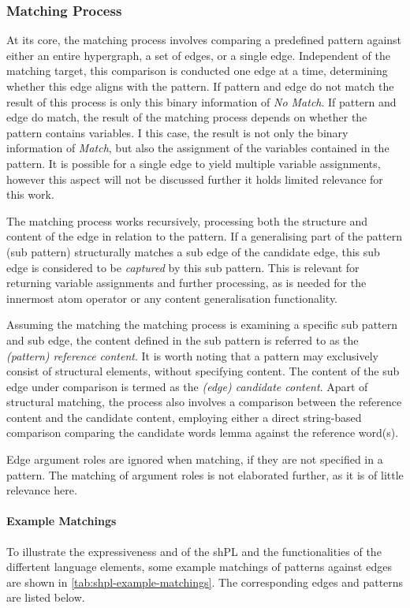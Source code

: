 \documentclass[11pt]{scrreprt}
\begin{document}
\subsubsection{Matching Process}
\label{sec:pattern-matching-process}
At its core, the matching process involves comparing a predefined pattern against either an entire hypergraph, a set of edges, or a single edge. Independent of the matching target, this comparison is conducted one edge at a time, determining whether this edge aligns with the pattern. If pattern and edge do not match the result of this process is only this binary information of \textit{No Match}. If pattern and edge do match, the result of the matching process depends on whether the pattern contains variables. I this case, the result is not only the binary information of \textit{Match}, but also the assignment of the variables contained in the pattern. It is possible for a single edge to yield multiple variable assignments, however this aspect will not be discussed further it holds limited relevance for this work. 

The matching process works recursively, processing both the structure and content of the edge in relation to the pattern. If a generalising part of the pattern (sub pattern) structurally matches a sub edge of the candidate edge, this sub edge is considered to be \textit{captured} by this sub pattern. This is relevant for returning variable assignments and further processing, as is needed for the innermost atom operator or any content generalisation functionality.

Assuming the matching the matching process is examining a specific sub pattern and sub edge, the content defined in the sub pattern is referred to as the \textit{(pattern) reference content}. It is worth noting that a pattern may exclusively consist of structural elements, without specifying content. The content of the sub edge under comparison is termed as the \textit{(edge) candidate content}. Apart of structural matching, the process also involves a comparison between the reference content and the candidate content, employing either a direct string-based comparison comparing the candidate words lemma against the reference word(s).

Edge argument roles are ignored when matching, if they are not specified in a pattern. The matching of argument roles is not elaborated further, as it is of little relevance here.


\paragraph{Example Matchings} To illustrate the expressiveness and of the \gls{sh}PL and the
functionalities of the differtent language elements, some example matchings of patterns against edges are shown in \cref{tab:shpl-example-matchings}. The corresponding edges and patterns are listed below.
\end{document}
